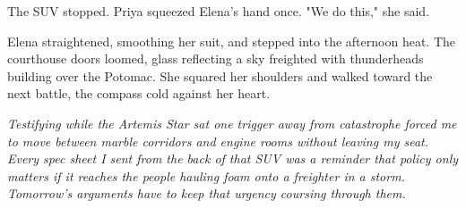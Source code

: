 The SUV stopped. Priya squeezed Elena's hand once. "We do this," she said.

Elena straightened, smoothing her suit, and stepped into the afternoon heat. The courthouse doors loomed, glass reflecting a sky freighted with thunderheads building over the Potomac. She squared her shoulders and walked toward the next battle, the compass cold against her heart.

\noindent\textit{Testifying while the \textit{Artemis Star} sat one trigger away from catastrophe forced me to move between marble corridors and engine rooms without leaving my seat. Every spec sheet I sent from the back of that SUV was a reminder that policy only matters if it reaches the people hauling foam onto a freighter in a storm. Tomorrow's arguments have to keep that urgency coursing through them.}
